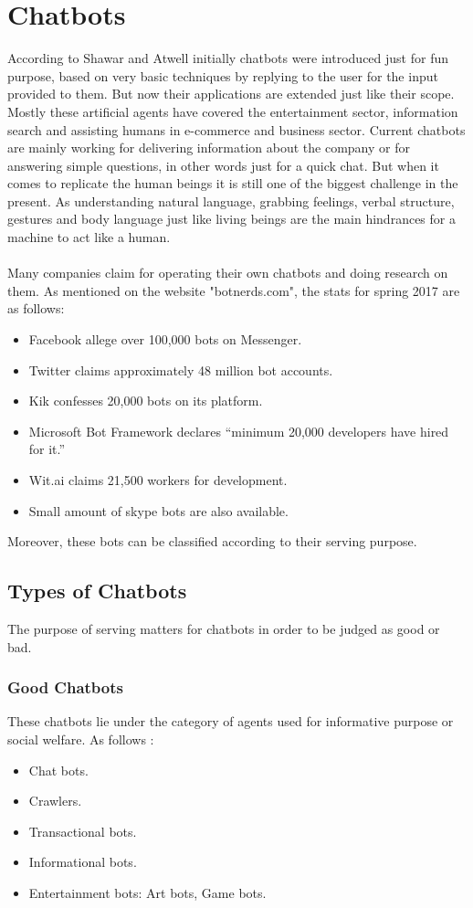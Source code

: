 \section{Chatbots}
According to Shawar and Atwell \cite{ChatbotsAreTheyReallyUseful} initially chatbots were introduced just for fun purpose, based on very basic techniques by replying to the user for the input provided to them. But now their applications are extended just like their scope. Mostly these artificial agents have covered the entertainment sector, information search and assisting humans in e-commerce and business sector. Current chatbots are mainly working for delivering information about the company or for answering simple questions, in other words just for a quick chat. But when it comes to replicate the human beings it is still one of the biggest challenge in the present. As understanding natural language, grabbing feelings, verbal structure, gestures and body language just like living beings are the main hindrances for a machine to act like a human. \cite{CreatingChatbotsToTalk}   
\\~\\
Many companies claim for operating their own chatbots and doing research on them. As mentioned on the website "botnerds.com"\cite{botnerds}, the stats for spring 2017 are as follows:
\begin{itemize}
\item Facebook allege over 100,000 bots on Messenger.
\item Twitter claims approximately 48 million bot accounts.
\item Kik confesses 20,000 bots on its platform.
\item Microsoft Bot Framework declares “minimum 20,000 developers have hired for it.”
\item Wit.ai claims 21,500 workers for development.
\item Small amount of skype bots are also available.
\end{itemize}
Moreover, these bots can be classified according to their serving purpose.

\subsection{Types of Chatbots}
The purpose of serving matters for chatbots in order to be judged as good or bad. 

\subsubsection*{Good Chatbots}
These chatbots lie under the category of agents used for informative purpose or social welfare. As follows \cite{botnerds}:
\begin{itemize}
\item Chat bots.
\item Crawlers.
\item Transactional bots.
\item Informational bots.
\item Entertainment bots: Art bots, Game bots.
\end{itemize}

